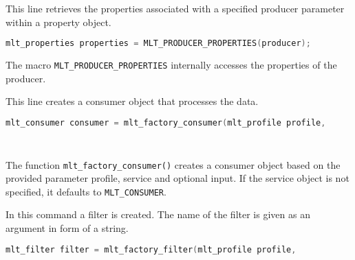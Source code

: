 \documentclass[../MasterThesis.tex]{subfiles}
\begin{document}
\begin{description}[font=\color{RedViolet!80!black}, style=nextline]
	
	
	\item[Create properties] 
	
	
	This line retrieves the properties associated with a specified producer parameter within a property object.
	
	\begin{lstlisting}[language=C, numbers=none, columns=fullflexible, belowskip=0pt, aboveskip=9pt]
	mlt_properties properties = MLT_PRODUCER_PROPERTIES(producer); \end{lstlisting}
	
	The macro \texttt{MLT\_PRODUCER\_PROPERTIES} internally accesses the properties of the producer.
	
	
	
	\item[Create a consumer] 
	
	This line creates a consumer object that processes the data.
	
	\begin{lstlisting}[language=C, numbers=none, columns=fullflexible, belowskip=0pt, aboveskip=9pt]
	mlt_consumer consumer = mlt_factory_consumer(mlt_profile profile, 
																							const char* service, 
																							const void* input); \end{lstlisting}
																
	The function \texttt{mlt\_factory\_consumer()} creates a consumer object based on the provided parameter profile, service and optional input. If the service object is not specified, it defaults to \texttt{MLT\_CONSUMER}.
											
																
	
	
	
	\item[Create a filter] 
	
	In this command a filter is created. The name of the filter is given as an argument in form of a string.
	
	\begin{lstlisting}[language=C, numbers=none, columns=fullflexible, belowskip=0pt, aboveskip=9pt]
	mlt_filter filter = mlt_factory_filter(mlt_profile profile, 
																						const char* service, 
																						const void* input); \end{lstlisting}
														

\end{description}
\end{document}

